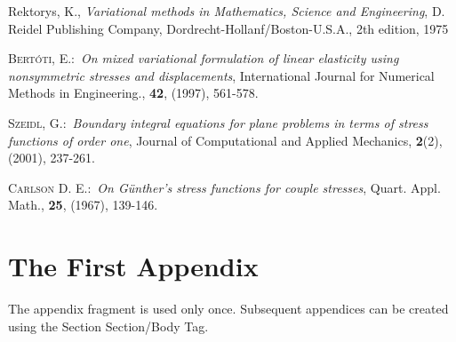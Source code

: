 \documentclass{article}%
\begin{document}
\begin{thebibliography}{9}                                                                                                %
Rektorys, K., \textit{Variational methods in Mathematics,
Science and Engineering}, D. Reidel Publishing Company,
Dordrecht-Hollanf/Boston-U.S.A., 2th edition, 1975

 \textsc{Bert\'{o}ti, E.}:\ \textit{On mixed variational formulation
of linear elasticity using nonsymmetric stresses and displacements}, International
Journal for Numerical Methods in Engineering., \textbf{42}, (1997), 561-578.

 \textsc{Szeidl, G.}:\ \textit{Boundary integral equations for
plane problems in terms of stress functions of order one}, Journal of Computational and
Applied Mechanics, \textbf{2}(2), (2001), 237-261.

  \textsc{Carlson D. E.}:\ \textit{On G\"{u}nther's stress functions
for couple stresses}, Quart. Appl. Math., \textbf{25}, (1967), 139-146.
\end{thebibliography}


\appendix

\section{The First Appendix}

The appendix fragment is used only once. Subsequent appendices can be created
using the Section Section/Body Tag.
\end{document}
